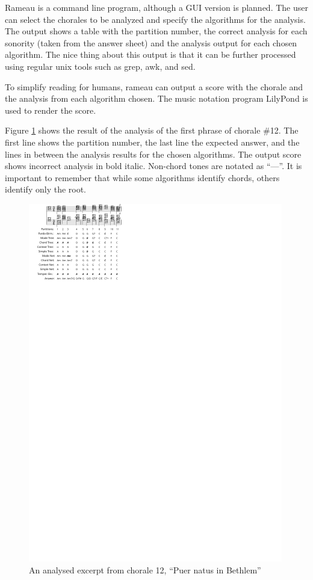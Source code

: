 \documentclass{article}
\begin{document}
Rameau is a command line program, although a GUI version is planned.
The user can select the chorales to be analyzed and specify the
algorithms for the analysis. The output shows a table with the
partition number, the correct analysis for each sonority (taken from
the answer sheet) and the analysis output for each chosen algorithm.
The nice thing about this output is that it can be further processed
using regular unix tools such as grep, awk, and sed.

To simplify reading for humans, rameau can output a score with the
chorale and the analysis from each algorithm chosen. The music
notation program LilyPond \cite{nienhuys.ea:lilypond} is used to
render the score.

Figure \ref{fig:coral-12} shows the result of the analysis of the
first phrase of chorale \#12. The first line shows the partition
number, the last line the expected answer, and the lines in between
the analysis results for the chosen algorithms. The output score shows
incorrect analysis in bold italic. Non-chord tones are notated as
``—''. It is important to remember that while some algorithms identify
chords, others identify only the root.

\begin{figure}
  \centering
  \includegraphics[scale=4]{coral-012}
  \caption{An analysed excerpt from chorale 12, ``Puer natus in Bethlem''}
  \label{fig:coral-12}
\end{figure}
\end{document}
